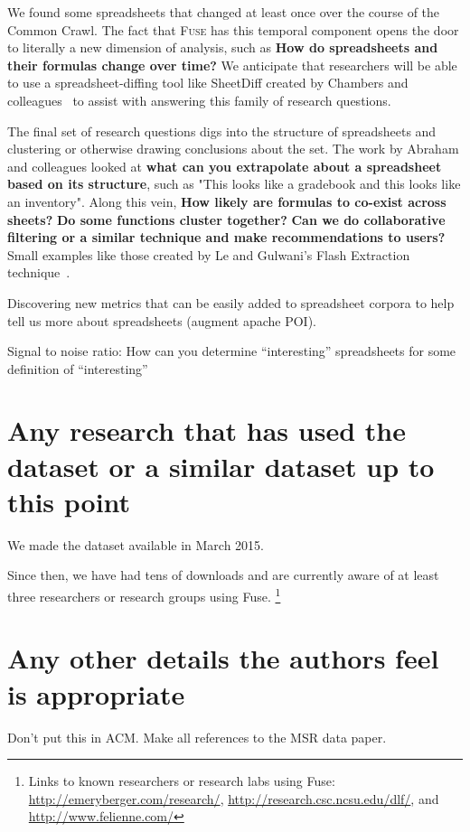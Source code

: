 \documentclass[conference]{IEEEtran}
\begin{document}
We found some spreadsheets that changed at least once over the course of the Common Crawl.
The fact that \textsc{Fuse} has this temporal component opens the door to literally a new dimension of analysis, such as \textbf{How do spreadsheets and their formulas change over time?}
We anticipate that researchers will be able to use a spreadsheet-diffing tool like SheetDiff created by Chambers and colleagues~\cite{chambers2010} to assist with answering this family of research questions.

The final set of research questions digs into the structure of spreadsheets and clustering or otherwise drawing conclusions about the set.
The work by Abraham and colleagues \cite{Abraham2006} looked at \textbf{what can you extrapolate about a spreadsheet based on its structure}, such as "This looks like a gradebook and this looks like an inventory".
Along this vein, \textbf{How likely are formulas to co-exist across sheets?} 
\textbf{Do some functions cluster together? }
\textbf{Can we do collaborative filtering or a similar technique and make recommendations to users? }
Small examples like those created by Le and Gulwani's Flash Extraction technique~\cite{le2014}.  

Discovering new metrics that can be easily added to spreadsheet corpora to help tell us more about spreadsheets (augment apache POI).

Signal to noise ratio: How can you determine ``interesting'' spreadsheets for some definition of ``interesting''

\section{Any research that has used the dataset or a similar dataset up to this point}
We made the dataset available in March 2015.  

Since then, we have had tens of downloads and are currently aware of at least three researchers or research groups using Fuse.  
\footnote{Links to known researchers or research labs using Fuse: \url{http://emeryberger.com/research/}, \url{http://research.csc.ncsu.edu/dlf/}, and \url{http://www.felienne.com/}}




\section{Any other details the authors feel is appropriate}
Don't put this in ACM.  Make all references to the MSR data paper.
\end{document}
